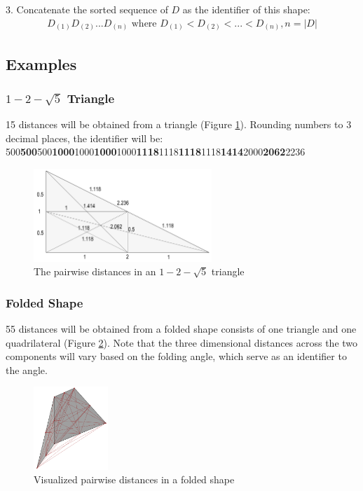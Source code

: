 \documentclass{article}
\begin{document}
3. Concatenate the sorted sequence of $D$ as the identifier of this shape:
\begin{align*}
	D_{(1)}D_{(2)}...D_{(n)} \text{ where } D_{(1)} < D_{(2)} < ... < D_{(n)}, n = |D|
\end{align*}

\subsection{Examples}

\subsubsection{$1-2-\sqrt{5}$ Triangle} 15 distances will be obtained from a triangle (Figure \ref{idexample1}). Rounding numbers to 3 decimal places, the identifier will be: 
 500\textbf{500}500\textbf{1000}1000\textbf{1000}1000\textbf{1118}1118\textbf{1118}1118\textbf{1414}2000\textbf{2062}2236

\begin{figure}[hbt!]
	\centering
	\includegraphics[width=0.6\textwidth]{Figures/IdentifierExample1.png}
	\caption{
        The pairwise distances in an $1-2-\sqrt{5}$ triangle	
    }
	\label{idexample1}
\end{figure}

\subsubsection{Folded Shape} 55 distances will be obtained from a folded shape consists of one triangle and one quadrilateral (Figure \ref{idexample2}). Note that the three dimensional distances across the two components will vary based on the folding angle, which serve as an identifier to the angle.

\begin{figure}[hbt!]
	\centering
	\includegraphics[width=0.25\textwidth]{Figures/IdentifierExample2.png}
	\caption{
        Visualized pairwise distances in a folded shape
    }
	\label{idexample2}
\end{figure}
\end{document}
